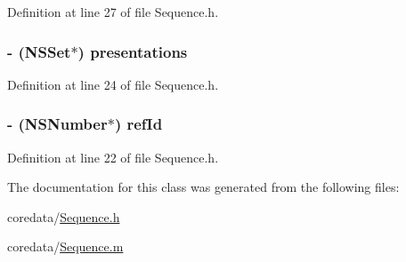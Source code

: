 Definition at line 27 of file Sequence.h.

\hypertarget{interface_sequence_a65e57b3bfdc709fe646a438154e98d56}{
\subsubsection[{presentations}]{\setlength{\rightskip}{0pt plus 5cm}-\/ (NSSet$\ast$) presentations}}
\label{interface_sequence_a65e57b3bfdc709fe646a438154e98d56}


Definition at line 24 of file Sequence.h.

\hypertarget{interface_sequence_ae24e2568d0d3a40bebefe304cb92656c}{
\subsubsection[{refId}]{\setlength{\rightskip}{0pt plus 5cm}-\/ (NSNumber$\ast$) refId}}
\label{interface_sequence_ae24e2568d0d3a40bebefe304cb92656c}


Definition at line 22 of file Sequence.h.



The documentation for this class was generated from the following files:\begin{DoxyCompactItemize}
\item 
coredata/\hyperlink{_sequence_8h}{Sequence.h}\item 
coredata/\hyperlink{_sequence_8m}{Sequence.m}\end{DoxyCompactItemize}
